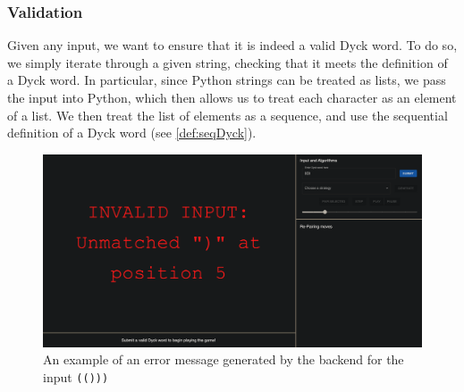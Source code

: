 \subsubsection{Validation}
Given any input, we want to ensure that it is indeed a valid Dyck word. To do so, we simply iterate through a given string, checking that it meets the definition of a Dyck word. In particular, since Python strings can be treated as lists, we pass the input into Python, which then allows us to treat each character as an element of a list. We then treat the list of elements as a sequence, and use the sequential definition of a Dyck word (see \autoref{def:seqDyck}). 

\begin{figure}[H]
    \centering
    \includegraphics[scale = 0.195]{./images/validationEx.png}
    \caption{An example of an error message generated by the backend for the input \texttt{(()))}}
\end{figure}

